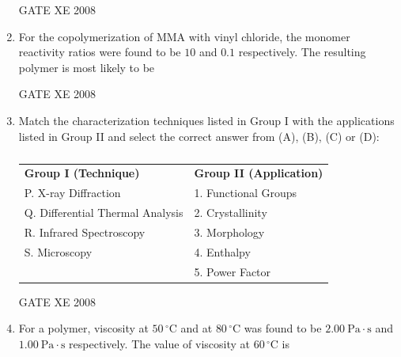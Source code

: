 \documentclass[12pt]{article}
\begin{document}
\begin{enumerate}
GATE XE 2008

\item For the copolymerization of MMA with vinyl chloride, the monomer reactivity ratios were found to be $10$ and $0.1$ respectively. The resulting polymer is most likely to be 

\begin{enumerate}
\end{enumerate}

 GATE XE 2008

\item Match the characterization techniques listed in Group I with the applications listed in Group II and select the correct answer from (A), (B), (C) or (D):

\begin{table}[H]     \centering     \caption{}     \label{}     \begin{tabular}{ll}
\textbf{Group I (Technique)} & \textbf{Group II (Application)} \\
P. X-ray Diffraction & 1. Functional Groups \\
Q. Differential Thermal Analysis & 2. Crystallinity \\
R. Infrared Spectroscopy & 3. Morphology \\
S. Microscopy & 4. Enthalpy \\
 & 5. Power Factor \\
\end{tabular} \end{table}

\begin{enumerate}
\end{enumerate}

GATE XE 2008

\item For a polymer, viscosity at $50\,^{\circ}\mathrm{C}$ and at $80\,^{\circ}\mathrm{C}$ was found to be $2.00~\mathrm{Pa\cdot s}$ and $1.00~\mathrm{Pa\cdot s}$ respectively. The value of viscosity at $60\,^{\circ}\mathrm{C}$ is  


\end{enumerate}
\end{document}
